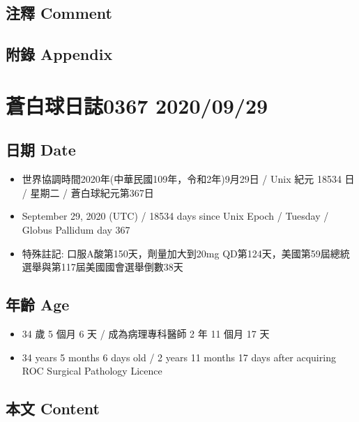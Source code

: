 \documentclass[
]{article}
\providecommand{\tightlist}{%
  \setlength{\itemsep}{0pt}\setlength{\parskip}{0pt}}
\begin{document}
\hypertarget{ux6ce8ux91cb-comment-26}{%
\subsection{注釋 Comment}\label{ux6ce8ux91cb-comment-26}}

\hypertarget{ux9644ux9304-appendix-26}{%
\subsection{附錄 Appendix}\label{ux9644ux9304-appendix-26}}

\hypertarget{ux84bcux767dux7403ux65e5ux8a8c0367-20200929}{%
\section{蒼白球日誌0367
2020/09/29}\label{ux84bcux767dux7403ux65e5ux8a8c0367-20200929}}

\hypertarget{ux65e5ux671f-date-27}{%
\subsection{日期 Date}\label{ux65e5ux671f-date-27}}

\begin{itemize}
\tightlist
\item
  世界協調時間2020年(中華民國109年，令和2年)9月29日 / Unix 紀元 18534 日
  / 星期二 / 蒼白球紀元第367日
\item
  September 29, 2020 (UTC) / 18534 days since Unix Epoch / Tuesday /
  Globus Pallidum day 367
\item
  特殊註記: 口服A酸第150天，劑量加大到20mg
  QD第124天，美國第59屆總統選舉與第117屆美國國會選舉倒數38天
\end{itemize}

\hypertarget{ux5e74ux9f61-age-27}{%
\subsection{年齡 Age}\label{ux5e74ux9f61-age-27}}

\begin{itemize}
\tightlist
\item
  34 歲 5 個月 6 天 / 成為病理專科醫師 2 年 11 個月 17 天
\item
  34 years 5 months 6 days old / 2 years 11 months 17 days after
  acquiring ROC Surgical Pathology Licence
\end{itemize}

\hypertarget{ux672cux6587-content-27}{%
\subsection{本文 Content}\label{ux672cux6587-content-27}}
\end{document}
